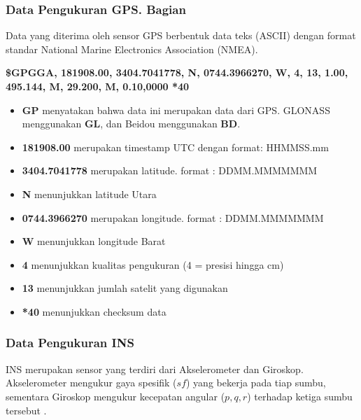\begin{frame}[allowframebreaks]
    \frametitle{Data Pengukuran GPS. Bagian}

    Data yang diterima oleh sensor GPS berbentuk data teks (ASCII) dengan format standar National Marine Electronics Association (NMEA).

    \textbf{\$GPGGA, 181908.00, 3404.7041778, N, 0744.3966270, W, 4, 13, 1.00, 495.144, M, 29.200, M, 0.10,0000 *40}

    \begin{itemize}
        \item \textbf{GP} menyatakan bahwa data ini merupakan data dari GPS. GLONASS menggunakan \textbf{GL}, dan Beidou menggunakan \textbf{BD}.
        \item \textbf{181908.00} merupakan timestamp UTC dengan format: HHMMSS.mm
        \item \textbf{3404.7041778} merupakan latitude. format : DDMM.MMMMMMM
        \item \textbf{N} menunjukkan latitude Utara
        \item \textbf{0744.3966270} merupakan longitude. format : DDMM.MMMMMMM
        \item \textbf{W} menunjukkan longitude Barat
        \item \textbf{4} menunjukkan kualitas pengukuran (4 = presisi hingga cm)
        \item \textbf{13} menunjukkan jumlah satelit yang digunakan
        \item \textbf{*40} menunjukkan checksum data
    \end{itemize}
\end{frame}


\begin{frame}
    \frametitle{Data Pengukuran INS}

    INS merupakan sensor yang terdiri dari Akselerometer dan Giroskop. Akselerometer mengukur gaya spesifik ($sf$) yang bekerja pada tiap sumbu, sementara Giroskop mengukur kecepatan angular ($p, q, r$) terhadap ketiga sumbu tersebut \cite{alam2016ins}.
\end{frame}


